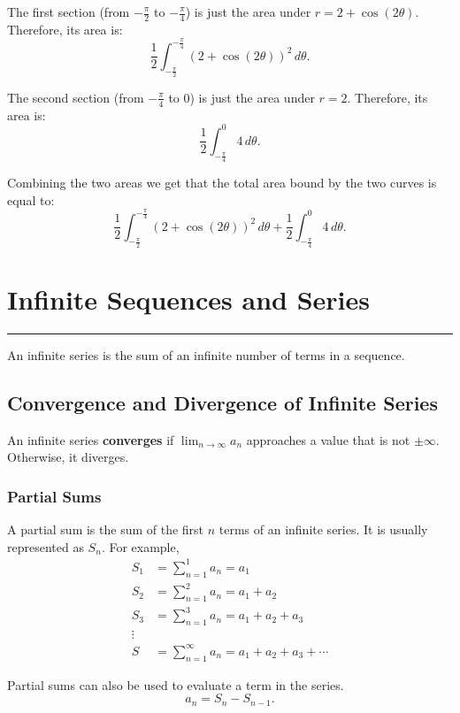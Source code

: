 \documentclass[12pt]{article}
\newcommand{\fline}{\par\noindent\rule{\textwidth}{0.1pt}} %
\begin{document}
\begin{enumerate}
          The first section (from $-\frac{\pi}{2}$ to $-\frac{\pi}{4}$) is just the area under $r=2+\cos(2\theta)$. Therefore, its area is:
          \[ \frac{1}{2} \int_{-\frac{\pi}{2}}^{-\frac{\pi}{4}} \left( 2+\cos(2\theta) \right)^2 \, d\theta. \]

          The second section (from $-\frac{\pi}{4}$ to $0$) is just the area under $r=2$. Therefore, its area is:
          \[ \frac{1}{2} \int_{-\frac{\pi}{4}}^0 4 \, d\theta. \]

          Combining the two areas we get that the total area bound by the two curves is equal to:
          \[ \frac{1}{2} \int_{-\frac{\pi}{2}}^{-\frac{\pi}{4}} \left( 2+\cos(2\theta) \right)^2 \, d\theta + \frac{1}{2} \int_{-\frac{\pi}{4}}^0 4 \, d\theta. \]
\end{enumerate}

\section{Infinite Sequences and Series}
\fline

\noindent An infinite series is the sum of an infinite number of terms in a sequence.

\subsection{Convergence and Divergence of Infinite Series}
An infinite series \textbf{converges} if $\displaystyle \lim_{n \to \infty} a_n$ approaches a value that is not $\pm \infty$. Otherwise, it diverges.

\subsubsection{Partial Sums}
A partial sum is the sum of the first $n$ terms of an infinite series. It is usually represented as $S_n$. For example,
\begin{align*}
    S_1 & = \sum_{n=1}^1 a_n = a_1                           \\
    S_2 & = \sum_{n=1}^2 a_n = a_1 + a_2                     \\
    S_3 & = \sum_{n=1}^3 a_n = a_1 + a_2 + a_3               \\
    \vdots                                                   \\
    S   & = \sum_{n=1}^\infty a_n = a_1 + a_2 + a_3 + \cdots
\end{align*}

\noindent Partial sums can also be used to evaluate a term in the series.
\[ a_n = S_n - S_{n-1}. \]
\end{document}
